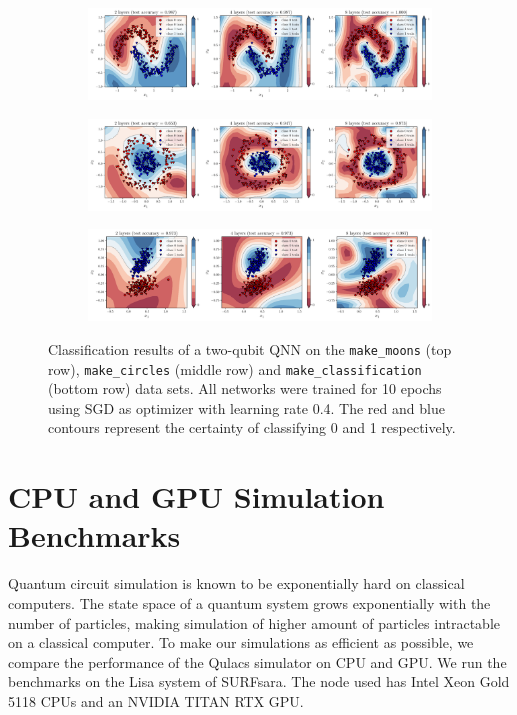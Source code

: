 \documentclass[a4paper,10pt]{article}
\begin{document}
\begin{appendices}
\begin{figure}[ht]
	\centering
	\begin{subfigure}{.9458\textwidth}
		\centering
		\includegraphics[width=1\linewidth]{figures/qnn_moons_classification.pdf}
	\end{subfigure}
	\begin{subfigure}{.9458\textwidth}
		\centering
		\includegraphics[width=1\linewidth]{figures/qnn_circles_classification.pdf}
	\end{subfigure}
	\begin{subfigure}{.9458\textwidth}
		\centering
		\includegraphics[width=1\linewidth]{figures/qnn_linear_classification.pdf}
	\end{subfigure}
	\cprotect\caption{Classification results of a two-qubit QNN on the \verb|make_moons| (top row), \verb|make_circles| (middle row) and \verb|make_classification| (bottom row) data sets. All networks were trained for 10 epochs using SGD as optimizer with learning rate 0.4. The red and blue contours represent the certainty of classifying 0 and 1 respectively.}
	\label{fig:classification_decision_regions}
\end{figure}

\section{CPU and GPU Simulation Benchmarks} \label{sec:cpu-gpu-benchmark}
Quantum circuit simulation is known to be exponentially hard on classical computers.
The state space of a quantum system grows exponentially with the number of particles, making simulation of higher amount of particles intractable on a classical computer.
To make our simulations as efficient as possible, we compare the performance of the Qulacs simulator on CPU and GPU.
We run the benchmarks on the Lisa system of SURFsara.
The node used has Intel Xeon Gold 5118 CPUs and an NVIDIA TITAN RTX GPU.


\end{appendices}
\end{document}
